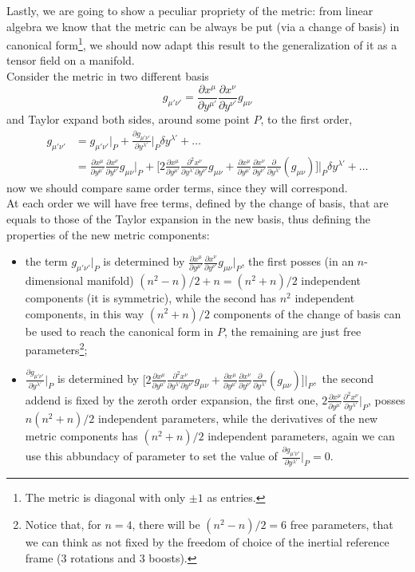 Lastly, we are going to show a peculiar propriety of the metric: from linear algebra we know that the metric can be always be put (via a change of basis) in canonical form\footnote{The metric is diagonal with only $\pm1$ as entries.}, we should now adapt this result to the generalization of it as a tensor field on a manifold.\\
Consider the metric in two different basis $$g_{\mu'\nu'}=\frac{\partial x^\mu}{\partial y^{\mu'}}\frac{\partial x^\nu}{\partial y^{\nu'}}g_{\mu\nu}$$ and Taylor expand both sides, around some point $P$, to the first order,
\begin{align*}
    g_{\mu'\nu'}&=g_{\mu'\nu'}\big|_P+\frac{\partial g_{\mu'\nu'}}{\partial y^{\lambda'}}\bigg|_P\delta y^{\lambda'}+\dots\\
    &=\frac{\partial x^\mu}{\partial y^{\mu'}}\frac{\partial x^\nu}{\partial y^{\nu'}}g_{\mu\nu}\bigg|_{P}+\bigg[2\frac{\partial x^\mu}{\partial y^{\mu'}}\frac{\partial^2x^\nu}{\partial y^{\lambda'}\partial y^{\nu'}}g_{\mu\nu}+\frac{\partial x^\mu}{\partial y^{\mu'}}\frac{\partial x^\nu}{\partial y^{\nu'}}\frac{\partial}{\partial y^{\lambda'}}(g_{\mu\nu})\bigg]\bigg|_P\delta y^{\lambda'}+\dots
\end{align*}
now we should compare same order terms, since they will correspond.\\
At each order we will have free terms, defined by the change of basis, that are equals to those of the Taylor expansion in the new basis, thus defining the properties of the new metric components:
\begin{itemize}
    \item the term $g_{\mu'\nu'}\big|_P$ is determined by $\frac{\partial x^\mu}{\partial y^{\mu'}}\frac{\partial x^\nu}{\partial y^{\nu'}}g_{\mu\nu}\big|_{P}$, the first posses (in an $n$-dimensional manifold) $(n^2-n)/2+n=(n^2+n)/2$ independent components (it is symmetric), while the second has $n^2$ independent components, in this way $(n^2+n)/2$ components of the change of basis can be used to reach the canonical form in $P$, the remaining are just free parameters\footnote{Notice that, for $n=4$, there will be $(n^2-n)/2=6$ free parameters, that we can think as not fixed by the freedom of choice of the inertial reference frame ($3$ rotations and $3$ boosts).};
    \item $\frac{\partial g_{\mu'\nu'}}{\partial y^{\lambda'}}\bigg|_P$ is determined by $\bigg[2\frac{\partial x^\mu}{\partial y^{\mu'}}\frac{\partial^2x^\nu}{\partial y^{\lambda'}\partial y^{\nu'}}g_{\mu\nu}+\frac{\partial x^\mu}{\partial y^{\mu'}}\frac{\partial x^\nu}{\partial y^{\nu'}}\frac{\partial}{\partial y^{\lambda'}}(g_{\mu\nu})\bigg]\bigg|_P,$ the second addend is fixed by the zeroth order expansion, the first one, $2\frac{\partial x^\mu}{\partial y^{\mu'}}\frac{\partial^2x^\nu}{\partial y^{\lambda'}}\big|_P$, posses $n(n^2+n)/2$ independent parameters, while the derivatives of the new metric components has $(n^2+n)/2$ independent parameters, again we can use this abbundacy of parameter to set the value of $\frac{\partial g_{\mu'\nu'}}{\partial y^{\lambda'}}\big|_P=0$.\\
\end{itemize}
